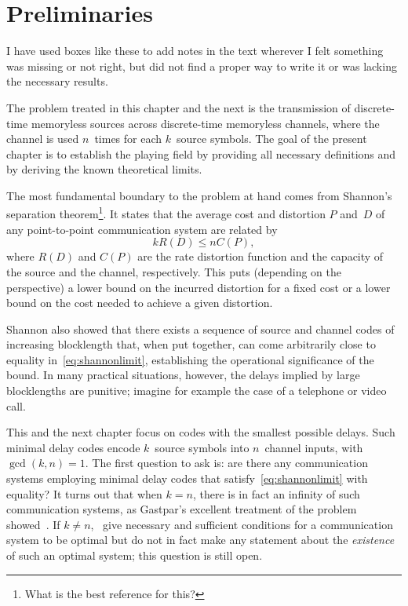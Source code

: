 \chapter{Preliminaries}
\label{ch:prelim}

\begin{notebox}
  I have used boxes like these to add notes in the text wherever I felt
  something was missing or not right, but did not find a proper way to write it
  or was lacking the necessary results.
\end{notebox}
The problem treated in this chapter and the next is the transmission of
discrete-time memoryless sources across discrete-time memoryless channels, where
the channel is used $n$~times for each $k$~source symbols.  The goal of the
present chapter is to establish the playing field by providing all necessary
definitions and by deriving the known theoretical limits.

The most fundamental boundary to the problem at hand comes from Shannon's
separation theorem\footnote{What is the best reference for this?}. It states
that the average cost and distortion $P$ and~$D$ of any point-to-point
communication system are related by
\begin{equation}
  \label{eq:shannonlimit}
  k R(D) \le n C(P),
\end{equation}
where $R(D)$ and $C(P)$ are the rate distortion function and the capacity of the
source and the channel, respectively. This puts (depending on the perspective) a
lower bound on the incurred distortion for a fixed cost or a lower bound on the
cost needed to achieve a given distortion.

Shannon also showed that there exists a sequence of source and channel codes of
increasing blocklength that, when put together, can come arbitrarily close to
equality in~\eqref{eq:shannonlimit}, establishing the operational significance
of the bound. In many practical situations, however, the delays implied by large
blocklengths are punitive; imagine for example the case of a telephone or video
call.

%
This and the next chapter focus on codes with the smallest possible delays. Such
minimal delay codes encode $k$~source symbols into $n$~channel inputs, with
$\gcd(k,n) = 1$.  The first question to ask is: are there any communication
systems employing minimal delay codes that satisfy~\eqref{eq:shannonlimit} with
equality? It turns out that when $k=n$, there is in fact an infinity of such
communication systems, as Gastpar's excellent treatment of the problem
showed~\cite{GastparRV2003}. If $k \ne n$,
\cite{GastparRV2003,GastparThesis}~give necessary and sufficient conditions for
a communication system to be optimal but do not in fact make any statement about
the \emph{existence} of such an optimal system; this question is still open. 


